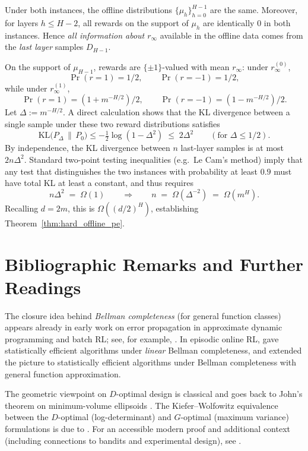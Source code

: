 Under both instances, the offline distributions $\{\mu_h\}_{h=0}^{H-1}$ are the same.
Moreover, for layers $h\le H-2$, all rewards on the support of $\mu_h$ are
identically $0$ in both instances.  Hence \emph{all information about $r_\infty$}
available in the offline data comes from the \emph{last layer} samples $D_{H-1}$.

On the support of $\mu_{H-1}$, rewards are $\{\pm1\}$-valued with mean $r_\infty$:
under $r_\infty^{(0)}$,
\[
\Pr(r=1)=1/2,\qquad \Pr(r=-1)=1/2,
\]
while under $r_\infty^{(1)}$,
\[
\Pr(r=1)=(1+m^{-H/2})/2,\qquad \Pr(r=-1)=(1-m^{-H/2})/2.
\]
Let $\Delta:=m^{-H/2}$.  A direct calculation shows that the KL divergence between
a single sample under these two reward distributions satisfies
\[
\mathrm{KL}\big(P_{\Delta}\,\|\,P_{0}\big)
\leq -\tfrac12\log(1-\Delta^2)
\;\le\; 2\Delta^2
\qquad (\text{for }\Delta\le 1/2).
\]
By independence, the KL divergence between $n$ last-layer samples is at most
$2n\Delta^2$.  Standard two-point testing inequalities (e.g.\ Le Cam's
method) imply that any test that distinguishes the two 
instances with probability at least $0.9$ must have total KL at least a constant,
and thus requires
\[
n\Delta^2 \;=\; \Omega(1)
\qquad\Longrightarrow\qquad
n \;=\; \Omega(\Delta^{-2}) \;=\; \Omega(m^H).
\]
Recalling $d=2m$, this is $\Omega((d/2)^H)$, establishing
Theorem~\ref{thm:hard_offline_pe}.


\section{Bibliographic Remarks and Further Readings}
\label{chapterBC_bib}

The closure idea behind \emph{Bellman completeness} (for general function classes)
appears already in early work on error propagation in approximate dynamic
programming and batch RL; see, for example, \citet{munos2005error}.  In episodic
online RL, \citet{zanette2020learning} gave statistically efficient algorithms
under \emph{linear} Bellman completeness, and \citet{jin2021bellman} extended the
picture to statistically efficient algorithms under Bellman completeness with
general function approximation.

The geometric viewpoint on $D$-optimal design is classical and goes back to
John's theorem on minimum-volume ellipsoids \citep{john1948extremum}.  The
Kiefer--Wolfowitz equivalence between the $D$-optimal (log-determinant) and
$G$-optimal (maximum variance) formulations is due to \citet{Kiefer1960TheEO}.
For an accessible modern proof and additional context (including connections to
bandits and experimental design), see \citet{lattimore2020bandit}.


